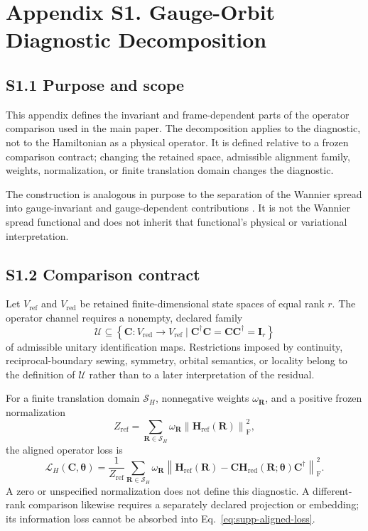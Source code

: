 \section*{Appendix S1. Gauge-Orbit Diagnostic Decomposition}
\label{supp:orbit-diagnostic}
\renewcommand{\theequation}{S1.\arabic{equation}}
\setcounter{equation}{0}

\subsection*{S1.1 Purpose and scope}

This appendix defines the invariant and frame-dependent parts of the operator
comparison used in the main paper. The decomposition applies to the diagnostic,
not to the Hamiltonian as a physical operator. It is defined relative to a
frozen comparison contract; changing the retained space, admissible alignment
family, weights, normalization, or finite translation domain changes the
diagnostic.

The construction is analogous in purpose to the separation of the Wannier
spread into gauge-invariant and gauge-dependent contributions
\cite{marzari1997,marzari2012,panati2013}. It is not the Wannier spread
functional and does not inherit that functional's physical or variational
interpretation.

\subsection*{S1.2 Comparison contract}

Let $V_{\mathrm{ref}}$ and $V_{\mathrm{red}}$ be retained finite-dimensional
state spaces of equal rank $r$. The operator channel requires a nonempty,
declared family
\[
 \mathcal U\subseteq
 \left\{\bm C:V_{\mathrm{red}}\rightarrow V_{\mathrm{ref}}
 \mid \bm C^\dagger\bm C=\bm C\bm C^\dagger=\bm I_r\right\}
\]
of admissible unitary identification maps. Restrictions imposed by continuity,
reciprocal-boundary sewing, symmetry, orbital semantics, or locality belong to
the definition of $\mathcal U$ rather than to a later interpretation of the
residual.

For a finite translation domain $\mathcal S_H$, nonnegative weights
$\omega_{\bm R}$, and a positive frozen normalization
\[
 Z_{\mathrm{ref}}=
 \sum_{\bm R\in\mathcal S_H}\omega_{\bm R}
 \left\|\bm H_{\mathrm{ref}}(\bm R)\right\|_{\mathrm F}^2,
\]
the aligned operator loss is
\begin{equation}
 \mathcal L_H(\bm C,\bm\theta)=
 \frac{1}{Z_{\mathrm{ref}}}
 \sum_{\bm R\in\mathcal S_H}\omega_{\bm R}
 \left\|
 \bm H_{\mathrm{ref}}(\bm R)
 -\bm C\bm H_{\mathrm{red}}(\bm R;\bm\theta)\bm C^\dagger
 \right\|_{\mathrm F}^2.
 \label{eq:supp-aligned-loss}
\end{equation}
A zero or unspecified normalization does not define this diagnostic. A
different-rank comparison likewise requires a separately declared projection
or embedding; its information loss cannot be absorbed into
Eq.~\eqref{eq:supp-aligned-loss}.


